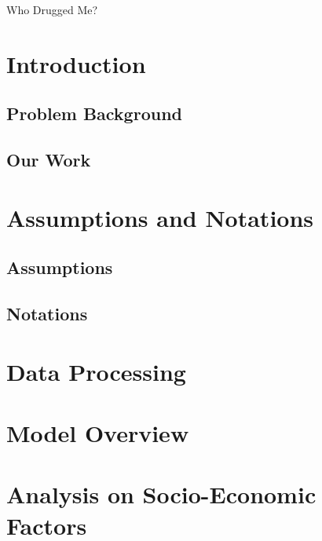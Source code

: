\documentclass[12pt]{article} %
\begin{document}
\cfoot{}
\thispagestyle{fancy}
\begin{center}
{\LARGE Who Drugged Me? }
\end{center}

\tableofcontents %
\newpage %

\section{Introduction} %
\subsection{Problem Background} %


\subsection{Our Work} %


\section{Assumptions and Notations} %
\subsection{Assumptions}


\subsection{Notations} %


\section{Data Processing}


\section{Model Overview} %


\section{Analysis on Socio-Economic Factors} 
\end{document}
